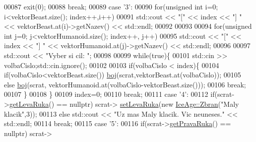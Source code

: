 \begin{DoxyCode}
00087                     exit(0);
00088                     \textcolor{keywordflow}{break};
00089                 \textcolor{keywordflow}{case} \textcolor{charliteral}{'3'}:
00090                     \textcolor{keywordflow}{for}(\textcolor{keywordtype}{unsigned} \textcolor{keywordtype}{int} i=0; i<vektorBeast.size(); index++,i++)
00091                         std::cout << \textcolor{stringliteral}{"["} << index << \textcolor{stringliteral}{"] "} << vektorBeast.at(i)->getNazev() << std::endl;
00092 
00093 
00094                     \textcolor{keywordflow}{for}(\textcolor{keywordtype}{unsigned} \textcolor{keywordtype}{int} j=0; j<vektorHumanoid.size(); index++, j++)
00095                         std::cout << \textcolor{stringliteral}{"["} << index << \textcolor{stringliteral}{"] "} << vektorHumanoid.at(j)->getNazev() << std::endl;
00096 
00097                     std::cout << \textcolor{stringliteral}{"Vyber si cil: "};
00098 
00099                     \textcolor{keywordflow}{while}(\textcolor{keyword}{true})\{
00101                         std::cin >> volbaCislo;std::cin.ignore();
00102 
00103                         \textcolor{keywordflow}{if}(volbaCislo < index)\{
00104                             \textcolor{keywordflow}{if}(volbaCislo<vektorBeast.size()) \hyperlink{namespaceIceAge_a2c6b97286bcd54e3ecf2fdc335460e90}{boj}(scrat,vektorBeast.at(volbaCislo));
00105                             \textcolor{keywordflow}{else} \hyperlink{namespaceIceAge_a2c6b97286bcd54e3ecf2fdc335460e90}{boj}(scrat, vektorHumanoid.at(volbaCislo-vektorBeast.size()));
00106                             \textcolor{keywordflow}{break};
00107                         \}
00108                     \}
00109                     index=0;
00110                     \textcolor{keywordflow}{break};
00111                 \textcolor{keywordflow}{case} \textcolor{charliteral}{'4'}:
00112                         \textcolor{keywordflow}{if}(scrat->\hyperlink{classIceAge_1_1ObleceneVybaveniVeverky_adf269e5fce3b68334fb50fbeb6992b18}{getLevaRuka}() == \textcolor{keyword}{nullptr}) scrat->
      \hyperlink{classIceAge_1_1ObleceneVybaveniVeverky_a2e4266a7941707c95f8ec2c41a7b97bb}{setLevaRuka}(\textcolor{keyword}{new} \hyperlink{classIceAge_1_1Zbran}{IceAge::Zbran}(\textcolor{stringliteral}{"Maly klacik"},3));
00113                         \textcolor{keywordflow}{else} std::cout << \textcolor{stringliteral}{"Uz mas Maly klacik. Vic neuneses."} << std::endl;
00114                     \textcolor{keywordflow}{break};
00115                 \textcolor{keywordflow}{case} \textcolor{charliteral}{'5'}:
00116                         \textcolor{keywordflow}{if}(scrat->\hyperlink{classIceAge_1_1ObleceneVybaveniVeverky_a0ca3d404578b0099b97fc7910d5e718a}{getPravaRuka}() == \textcolor{keyword}{nullptr}) scrat->

\end{DoxyCode}
